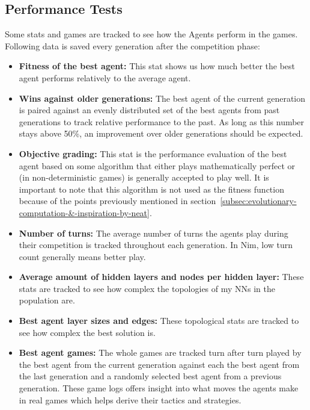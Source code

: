 \documentclass[11pt]{report}
\begin{document}
\begin{enumerate}
    \subsection{Performance Tests}\label{subsec:performance-tests}
    Some stats and games are tracked to see how the Agents perform in the games.
    Following data is saved every generation after the competition phase:
    \begin{itemize}
        \item \textbf{Fitness of the best agent:} This stat shows us how much better the best agent performs relatively to the average agent.
        \item \textbf{Wins against older generations:} The best agent of the current generation is paired against an evenly distributed set of the best agents from past generations to track relative performance to the past.
        As long as this number stays above 50\%, an improvement over older generations should be expected.
        \item \textbf{Objective grading:} This stat is the performance evaluation of the best agent based on some algorithm that either plays mathematically perfect or (in non-deterministic games) is generally accepted to play well.
        It is important to note that this algorithm is not used as the fitness function because of the points previously mentioned in section~\ref{subsec:evolutionary-computation-&-inspiration-by-neat}.
        \item \textbf{Number of turns:} The average number of turns the agents play during their competition is tracked throughout each generation.
        In Nim, low turn count generally means better play.
        \item \textbf{Average amount of hidden layers and nodes per hidden layer:} These stats are tracked to see how complex the topologies of my NNs in the population are.
        \item \textbf{Best agent layer sizes and edges:} These topological stats are tracked to see how complex the best solution is.
        \item \textbf{Best agent games:} The whole games are tracked turn after turn played by the best agent from the current generation against each the best agent from the last generation and a randomly selected best agent from a previous generation.
        These game logs offers insight into what moves the agents make in real games which helps derive their tactics and strategies.
    \end{itemize}


\end{enumerate}
\end{document}
